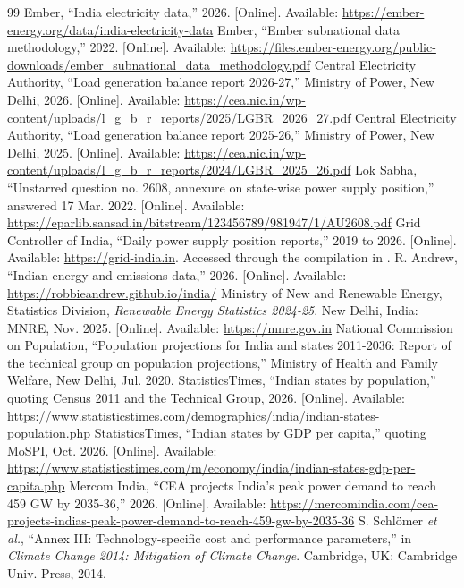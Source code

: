 \documentclass[10pt,a4paper]{article}
\begin{document}
\begin{thebibliography}{99}\small
\setlength{\itemsep}{1pt}
 Ember, ``India electricity data,'' 2026. [Online]. Available: \url{https://ember-energy.org/data/india-electricity-data}
 Ember, ``Ember subnational data methodology,'' 2022. [Online]. Available: \url{https://files.ember-energy.org/public-downloads/ember_subnational_data_methodology.pdf}
 Central Electricity Authority, ``Load generation balance report 2026-27,'' Ministry of Power, New Delhi, 2026. [Online]. Available: \url{https://cea.nic.in/wp-content/uploads/l_g_b_r_reports/2025/LGBR_2026_27.pdf}
 Central Electricity Authority, ``Load generation balance report 2025-26,'' Ministry of Power, New Delhi, 2025. [Online]. Available: \url{https://cea.nic.in/wp-content/uploads/l_g_b_r_reports/2024/LGBR_2025_26.pdf}
 Lok Sabha, ``Unstarred question no. 2608, annexure on state-wise power supply position,'' answered 17 Mar. 2022. [Online]. Available: \url{https://eparlib.sansad.in/bitstream/123456789/981947/1/AU2608.pdf}
 Grid Controller of India, ``Daily power supply position reports,'' 2019 to 2026. [Online]. Available: \url{https://grid-india.in}. Accessed through the compilation in \cite{andrew}.
 R. Andrew, ``Indian energy and emissions data,'' 2026. [Online]. Available: \url{https://robbieandrew.github.io/india/}
 Ministry of New and Renewable Energy, Statistics Division, \textit{Renewable Energy Statistics 2024-25}. New Delhi, India: MNRE, Nov. 2025. [Online]. Available: \url{https://mnre.gov.in}
 National Commission on Population, ``Population projections for India and states 2011-2036: Report of the technical group on population projections,'' Ministry of Health and Family Welfare, New Delhi, Jul. 2020.
 StatisticsTimes, ``Indian states by population,'' quoting Census 2011 and the Technical Group, 2026. [Online]. Available: \url{https://www.statisticstimes.com/demographics/india/indian-states-population.php}
 StatisticsTimes, ``Indian states by GDP per capita,'' quoting MoSPI, Oct. 2026. [Online]. Available: \url{https://www.statisticstimes.com/m/economy/india/indian-states-gdp-per-capita.php}
 Mercom India, ``CEA projects India's peak power demand to reach 459 GW by 2035-36,'' 2026. [Online]. Available: \url{https://mercomindia.com/cea-projects-indias-peak-power-demand-to-reach-459-gw-by-2035-36}
 S. Schl\"omer \textit{et al.}, ``Annex III: Technology-specific cost and performance parameters,'' in \textit{Climate Change 2014: Mitigation of Climate Change}. Cambridge, UK: Cambridge Univ. Press, 2014.

\end{thebibliography}
\end{document}
